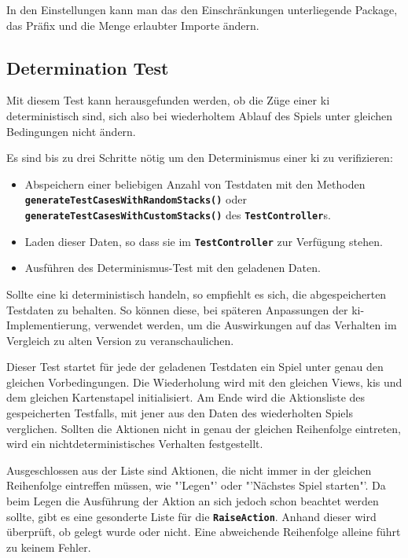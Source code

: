 \documentclass[
							a4paper, 
							11pt, 
							openany, 
							liststotoc,
							parskip=half, 
   							headings=normal
						]{scrreprt}
\begin{document}
{In den Einstellungen kann man das den Einschränkungen unterliegende Package, das Präfix und die Menge erlaubter Importe ändern.

\subsection{Determination Test} \label{sse:testing_tests_determination}
Mit diesem Test kann herausgefunden werden, ob die Züge einer \acs{ki} deterministisch sind, sich also bei wiederholtem Ablauf des Spiels unter gleichen Bedingungen nicht ändern.

Es sind bis zu drei Schritte nötig um den Determinismus einer \acs{ki} zu verifizieren:
\begin{itemize}
	\item Abspeichern einer beliebigen Anzahl von Testdaten mit den Methoden \textbf{\texttt{ge\-ne\-ra\-te\-Test\-Ca\-ses\-With\-Ran\-dom\-Stacks()}} oder \textbf{\texttt{ge\-ne\-ra\-te\-Test\-Ca\-ses\-With\-Cus\-tom\-Stacks()}}\newline
des \textbf{\texttt{TestController}}s.
	\item Laden dieser Daten, so dass sie im \textbf{\texttt{TestController}} zur Verfügung stehen.
	\item Ausführen des Determinismus-Test mit den geladenen Daten.
\end{itemize}

Sollte eine \acs{ki} deterministisch handeln, so empfiehlt es sich, die abgespeicherten Testdaten zu behalten. So können diese, bei späteren Anpassungen der \acs{ki}-Implementierung, verwendet werden, um die Auswirkungen auf das Verhalten im Vergleich zu alten Version zu veranschaulichen.

Dieser Test startet für jede der geladenen Testdaten ein Spiel unter genau den gleichen Vorbedingungen. Die Wiederholung wird mit den gleichen Views, \acs{ki}s und dem gleichen Kartenstapel initialisiert. Am Ende wird die Aktionsliste des gespeicherten Testfalls, mit jener aus den Daten des wiederholten Spiels verglichen. Sollten die Aktionen nicht in genau der gleichen Reihenfolge eintreten, wird ein nichtdeterministisches Verhalten festgestellt.

Ausgeschlossen aus der Liste sind Aktionen, die nicht immer in der gleichen Reihenfolge eintreffen müssen, wie "'Legen"' oder "'Nächstes Spiel starten"'.
Da beim Legen die Ausführung der Aktion an sich jedoch schon beachtet werden sollte, gibt es eine gesonderte Liste für die \textbf{\texttt{RaiseAction}}. Anhand dieser wird überprüft, ob gelegt wurde oder nicht. Eine abweichende Reihenfolge alleine führt zu keinem Fehler.

}
\end{document}

